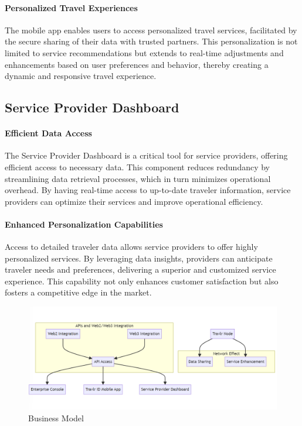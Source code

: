 \documentclass{article}
\begin{document}
\paragraph{Personalized Travel Experiences}

The mobile app enables users to access personalized travel services, facilitated by the secure sharing of their data with trusted partners. This personalization is not limited to service recommendations but extends to real-time adjustments and enhancements based on user preferences and behavior, thereby creating a dynamic and responsive travel experience.

\subsection{Service Provider Dashboard}

\paragraph{Efficient Data Access}

The Service Provider Dashboard is a critical tool for service providers, offering efficient access to necessary data. This component reduces redundancy by streamlining data retrieval processes, which in turn minimizes operational overhead. By having real-time access to up-to-date traveler information, service providers can optimize their services and improve operational efficiency.

\paragraph{Enhanced Personalization Capabilities}

Access to detailed traveler data allows service providers to offer highly personalized services. By leveraging data insights, providers can anticipate traveler needs and preferences, delivering a superior and customized service experience. This capability not only enhances customer satisfaction but also fosters a competitive edge in the market.

\begin{figure}[h]
    \centering
    \includegraphics[width=0.8\linewidth]{travlr_diagram_4.png}
    \caption{Business Model}
    \label{fig:enter-label}
\end{figure}
\end{document}
